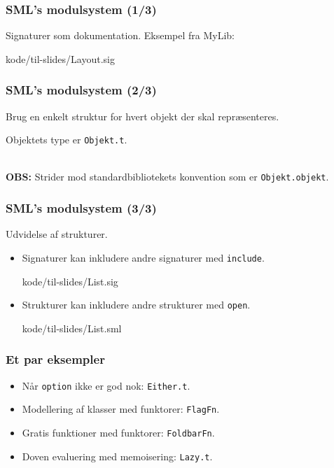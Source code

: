 \documentclass[slidestop,compress,mathserif, xcolor=table]{beamer}
\begin{document}
\begin{frame}
  \frametitle{SML's modulsystem \quad (1/3)}

  Signaturer som dokumentation. Eksempel fra MyLib:
  \begin{block}{}
    
    {kode/til-slides/Layout.sig}
  \end{block}
\end{frame}

\begin{frame}
  \frametitle{SML's modulsystem \quad (2/3)}
  Brug en enkelt struktur for hvert objekt der skal repræsenteres.

  \begin{block}{}
    \center Objektets type er \texttt{Objekt.t}.
  \end{block}\ \\

  \textbf{OBS:} Strider mod standardbibliotekets konvention som er
  \texttt{Objekt.objekt}.
\end{frame}

\begin{frame}
  \frametitle{SML's modulsystem \quad (3/3)}
  Udvidelse af strukturer.
  \begin{itemize}
  \item Signaturer kan inkludere andre signaturer med \texttt{include}.
    \begin{block}{}
    
    {kode/til-slides/List.sig}
    \end{block}
  \item Strukturer kan inkludere andre strukturer med \texttt{open}.
    \begin{block}{}
    
    {kode/til-slides/List.sml}
    \end{block}
  \end{itemize}
\end{frame}

\begin{frame}
  \frametitle{Et par eksempler}
  \begin{itemize}
  \item Når \texttt{option} ikke er god nok: \texttt{Either.t}.
  \item Modellering af klasser med funktorer: \texttt{FlagFn}.
  \item Gratis funktioner med funktorer: \texttt{FoldbarFn}.
  \item Doven evaluering med memoisering: \texttt{Lazy.t}.
  \end{itemize}
\end{frame}
\end{document}
